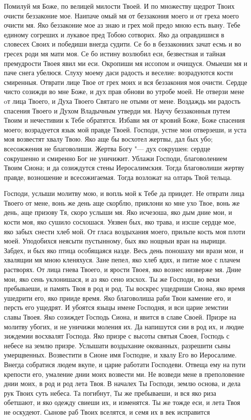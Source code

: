 \begin{mymulticols}
Помилуй мя Боже, по велицей милости Твоей. И по множеству щедрот Твоих очисти беззаконие мое. Наипаче омый мя от беззакония моего и от греха моего очисти мя. Яко беззаконие мое аз знаю и грех мой предо мною есть выну. Тебе единому согреших и лукавое пред Тобою сотворих. Яко да оправдишися в словесех Своих и победиши внегда судити. Се бо в беззакониих зачат есмь и во гресех роди мя мати моя. Се бо истину возлюбил еси, безвестная и тайная премудрости Твоея явил ми еси. Окропиши мя иссопом и очищуся. Омыеши мя и паче снега убелюся. Слуху моему даси радость и веселие: возрадуются кости смиренныя. Отврати лице Твое от грех моих и вся беззакония моя очисти. Сердце чисто созижди во мне Боже, и дух прав обнови во утробе моей. Не отверзи мене oт лица Твоего, и Духа Твоего Святаго не отыми от мене. Воздаждь ми радость спасения Твоего и Духом Владычным утверди мя. Научу беззаконныя путем Твоим и нечестивии к Тебе обратятся. Избави мя от кровий Боже, Боже спасения моего; возрадуется язык мой правде Твоей. Господи, устне мои отверзеши, и уста моя возвестят хвалу Твою. Яко аще бы восхотел жертвы, дал бых убо; всесожжения не благоволиши. Жертва Богу "--- дух сокрушен: сердце сокрушенно и смиренно Бог не уничижит. Ублажи Господи, благоволением Твоим Сиона; и да созиждутся стены Иеросалимския. Тогда благоволиши жертву правде, возношение и всесожигаемая. Тогда возложат на олтарь Твой тельца.




Господи, услыши молитву мою, и вопль мой к Тебе да приидет. Не отврати лица Твоего от мене, вонь же день аще скорблю, приклони ко мне ухо Твое, вонь же день, аще призову Тя, скоро услыши мя. Яко исчезоша, яко дым дние мои, и кости моя, яко сушило сосхошася. Уязвен бых, яко трава, и изсше сердце мое, яко забых снести хлеб мой. От гласа воздыхания моего, прильпе кость моя плоти моей. Уподобихся неясыти пустынному, бых яко нощныи вран на нырищи. Забдех, и бых яко птица особящаяся назде. Весь день поношаху ми врази мои, и хвалящии мя мною кленяхуся. Зане пепел, яко хлеб ядях, и питие мое с плачем растворях. От лица гнева Твоего, и ярости Твоея, яко вознес низверже мя. Дние мои, яко сень уклонишася, и аз яко сено изсхох. Ты же Господи, во веки пребываеши, и память Твоя в род и род. Ты воскрес ущедриши Сиона, яко время ушедрити его, яко прииде время. Яко благоволиша раби Твои камение его, и персть его ущедрят. И убоятся языцы имене Господня, и вси царие земстии славы Твоея. Яко созиждет Господь Сиона, и явится в славе Своей. Призре на молитву убогих, и не уничижи моления их. Да напишутся сии в род их, и людие зиждемии восхвалят Господа. Яко призре с высоты святыя Своея, Господь с небесе на землю призре. Услышати воздыхание окованных, разрешити сыны умерщвенных. Возвестити в Сионе имя Господне, и хвалу Его во Иеросалиме. Внегда собратися людем вкупе, и царие работати Господеви. Отвеща ему на пути крепости его, умаление днии моих возвести ми. Не возведи мене в преполовение днии моих, в род и род лета Твоя. В началех Ты Господи, землю основа, и дела рук Твоих суть небеса. Та погибнут, Ты же пребываеши, и вся яко риза обетшают, и яко одежду свиеши их, и изменятся. Ты же тожде еси, и лета Твоя не оскудеют. Сынове раб Твоих вселятся, и семя их в век исправится



\end{mymulticols}
